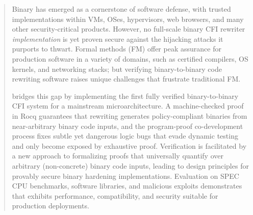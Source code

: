 \begin{abstract}
  Binary \cfi has emerged as a cornerstone of software defense, with trusted implementations within VMs, OSes, hypervisors, web browsers, and many other security-critical products.
  However, no full-scale binary CFI rewriter \emph{implementation} is yet proven secure against the hijacking attacks it purports to thwart.
  Formal methods (FM) offer peak assurance for production software in a variety of domains, such as certified compilers, OS kernels, and networking stacks; but verifying binary-to-binary code rewriting software raises unique challenges that frustrate traditional FM\@.

  \pname bridges this gap by implementing the first fully verified binary-to-binary CFI system for a mainstream microarchitecture.
  A machine-checked proof in Rocq guarantees that rewriting generates policy-compliant binaries from near-arbitrary binary code inputs,
  and the program-proof co-development process fixes subtle yet dangerous logic bugs that evade dynamic testing and only become exposed by exhaustive proof.
  Verification is facilitated by a new approach to formalizing proofs that universally quantify over arbitrary (non-concrete) binary code inputs, leading to design principles for provably secure binary hardening implementations.
  Evaluation on SPEC CPU benchmarks, software libraries, and malicious exploits demonstrates that \pname exhibits performance, compatibility, and security suitable for production deployments.
\end{abstract}
